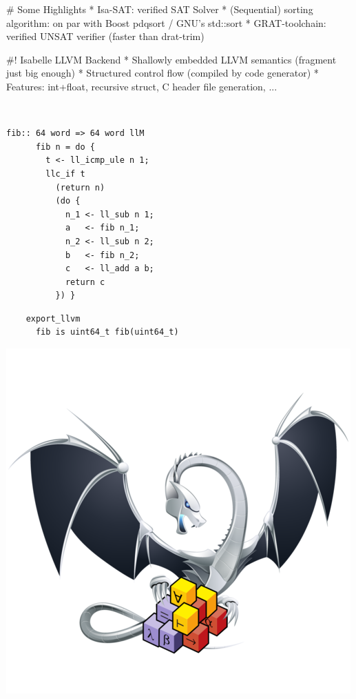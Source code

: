 \documentclass[fleqn]{beamer}
\begin{document}
# Some Highlights
  * Isa-SAT: verified SAT Solver
  * (Sequential) sorting algorithm: on par with Boost pdqsort / GNU's std::sort
  * GRAT-toolchain: verified UNSAT verifier (faster than drat-trim)



#! Isabelle LLVM Backend
  * Shallowly embedded LLVM semantics (fragment just big enough)
  * Structured control flow (compiled by code generator)
  * Features: int+float, recursive struct, C header file generation, ...

  {\small
  \begin{minipage}{.05\textwidth}{\ }\end{minipage}
  \begin{minipage}{.45\textwidth}
    \begin{lstlisting}[escapechar=!]
      fib:: 64 word => 64 word llM
      fib n = do {
        t <- ll_icmp_ule n 1;
        llc_if t
          (return n)
          (do {
            n_1 <- ll_sub n 1;
            a   <- fib n_1;
            n_2 <- ll_sub n 2;
            b   <- fib n_2;
            c   <- ll_add a b;
            return c
          }) }
    \end{lstlisting}
  \end{minipage}%
  \begin{minipage}{.3\textwidth}
  \begin{lstlisting}
    export_llvm
      fib is uint64_t fib(uint64_t)
  \end{lstlisting}
  \includegraphics[width=\textwidth]{isabelle-llvm.png}
  \end{minipage}
  }
\end{document}
